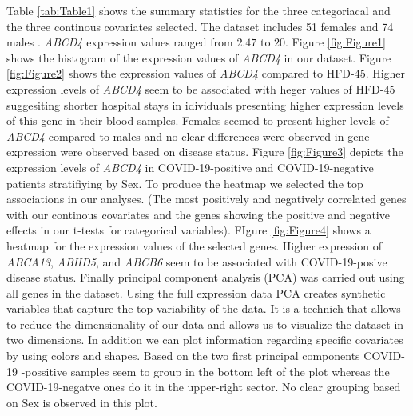 \documentclass[11pt,a4paper]{article}
\begin{document}
Table \ref{tab:Table1} shows the summary statistics for the three categoriacal and the three continous covariates selected. The dataset includes 51 females and 74  males .  \textit{ABCD4} expression values ranged from $2.47$ to $20$. Figure \ref{fig:Figure1} shows the histogram of the expression values of \textit{ABCD4} in our dataset. Figure \ref{fig:Figure2} shows the expression values of \textit{ABCD4}  compared to HFD-45. Higher expression levels of \textit{ABCD4}  seem to be associated with heger values of HFD-45 suggesiting shorter hospital stays in idividuals presenting higher expression levels of this gene in their blood samples. Females seemed to present higher levels of \textit{ABCD4}  compared to males and no clear differences were observed in gene expression were observed based on disease status. Figure  \ref{fig:Figure3} depicts the expression levels of  \textit{ABCD4} in COVID-19-positive and COVID-19-negative patients stratifiying by Sex. To produce the heatmap we selected the top associations in our analyses. (The most positively and negatively correlated genes with our continous covariates and the genes showing the positive and negative effects in our t-tests for categorical variables). FIgure  \ref{fig:Figure4}  shows a heatmap for the expression values of the selected genes. Higher expression of \textit{ABCA13}, \textit{ABHD5}, and \textit{ABCB6} seem to be associated with COVID-19-posive disease status. Finally principal component analysis (PCA) was carried out using all genes in the dataset. Using the full expression data PCA creates synthetic variables that capture the top variability of the data. It is a technich that allows to reduce the dimensionality of our data and allows us to visualize the dataset in two dimensions. In addition we can plot information regarding specific covariates by using colors and shapes. Based on the two first principal components COVID-19 -possitive samples seem to group in the bottom left of the plot whereas the COVID-19-negatve ones do it in the upper-right sector. No clear grouping based on Sex is observed in this plot.
\end{document}
